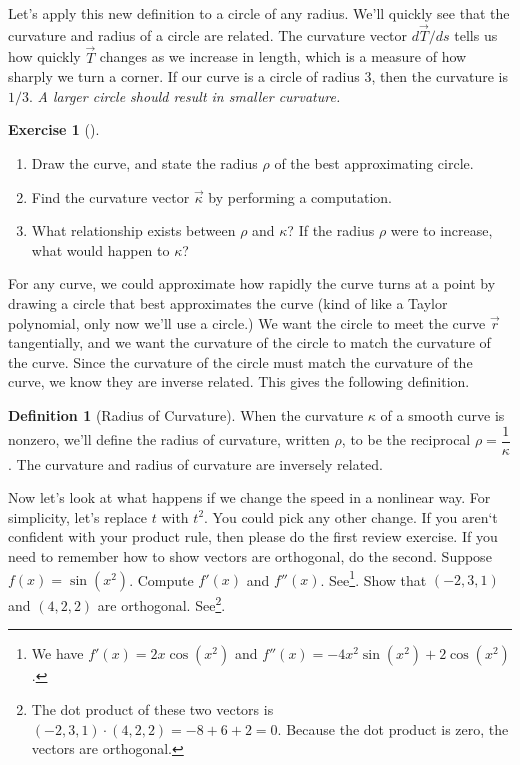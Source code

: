 \documentclass[10pt,]{book}
\theoremstyle{plain}
\theoremstyle{definition}
\newtheorem{definition}[theorem]{Definition}
\theoremstyle{definition}
\theoremstyle{definition}
\theoremstyle{definition}
\newtheorem{exploration}[project]{Exercise}
\theoremstyle{definition}
\numberwithin{equation}{section}
\begin{document}
Let's apply this new definition to a circle of any radius. We'll quickly see that the curvature and radius of a circle are related. The curvature vector \(d\vec T/ds\) tells us how quickly \(\vec T\) changes as we increase in length, which is a measure of how sharply we turn a corner. If our curve is a circle of radius \(3\), then the curvature is \(1/3\). \emph{A larger circle should result in smaller curvature.}%
\begin{exploration}[]\label{exploration-172}
\leavevmode%
\begin{enumerate}[font=\bfseries,label=(\alph*),ref=\alph*]
\item\label{task-414} Draw the curve, and state the radius \(\rho\) of the best approximating circle.%
\item\label{task-415} Find the curvature vector \(\vec \kappa\) by performing a computation.%
\item\label{task-416} What relationship exists between \(\rho\) and \(\kappa\)?  If the radius \(\rho\) were to increase, what would happen to \(\kappa\)?%
\end{enumerate}
\end{exploration}
For any curve, we could approximate how rapidly the curve turns at a point by drawing a circle that best approximates the curve (kind of like a Taylor polynomial, only now we'll use a circle.) We want the circle to meet the curve \(\vec r\) tangentially, and we want the curvature of the circle to match the curvature of the curve. Since the curvature of the circle must match the curvature of the curve, we know they are inverse related. This gives the following definition.%
\begin{definition}[{Radius of Curvature}]\label{definition-27}
When the curvature \(\kappa\) of a smooth curve is nonzero, we'll define the radius of curvature, written \(\rho\), to be the reciprocal \(\rho = \dfrac{1}{\kappa}\). The curvature and radius of curvature are inversely related.%
\end{definition}
Now let's look at what happens if we change the speed in a nonlinear way. For simplicity, let's replace \(t\) with \(t^2\). You could pick any other change. If you aren`t confident with your product rule, then please do the first review exercise. If you need to remember how to show vectors are orthogonal, do the second.%
Suppose \(f(x) = \sin(x^2)\). Compute \(f'(x)\) and \(f''(x)\). See\footnote{We have \(f'(x) = 2x\cos(x^2)\) and \(f''(x) = -4x^2\sin(x^2)+2\cos(x^2)\).\label{fn-11}}.%
Show that \((-2,3,1)\) and \((4,2,2)\) are orthogonal. See\footnote{The dot product of these two vectors is \((-2,3,1)\cdot(4,2,2) = -8+6+2=0\). Because the dot product is zero, the vectors are orthogonal.\label{fn-12}}.%
\end{document}

